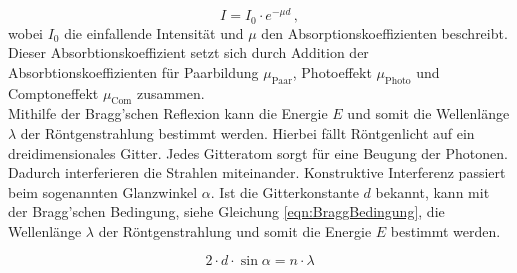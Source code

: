 \begin{equation*}
    I = I_0 \cdot e^{-\mu d} \, ,
\end{equation*}
wobei $I_0$ die einfallende Intensität und $\mu$ den Absorptionskoeffizienten beschreibt.
Dieser Absorbtionskoeffizient setzt sich durch Addition der Absorbtionskoeffizienten für Paarbildung $\mu_\text{Paar}$, Photoeffekt $\mu_\text{Photo}$ und Comptoneffekt $\mu_\text{Com}$ zusammen.
\\
Mithilfe der Bragg'schen Reflexion kann die Energie $E$ und somit die Wellenlänge $\lambda$ der Röntgenstrahlung bestimmt werden.
Hierbei fällt Röntgenlicht auf ein dreidimensionales Gitter.
Jedes Gitteratom sorgt für eine Beugung der Photonen.
Dadurch interferieren die Strahlen miteinander.
Konstruktive Interferenz passiert beim sogenannten Glanzwinkel $\alpha$.
Ist die Gitterkonstante $d$ bekannt, kann mit der Bragg'schen Bedingung, siehe Gleichung \eqref{eqn:BraggBedingung},
die Wellenlänge $\lambda$ der Röntgenstrahlung und somit die Energie $E$ bestimmt werden.

\begin{equation}
    \label{eqn:BraggBedingung}
    2 \cdot d \cdot \sin\alpha = n \cdot \lambda
\end{equation}
